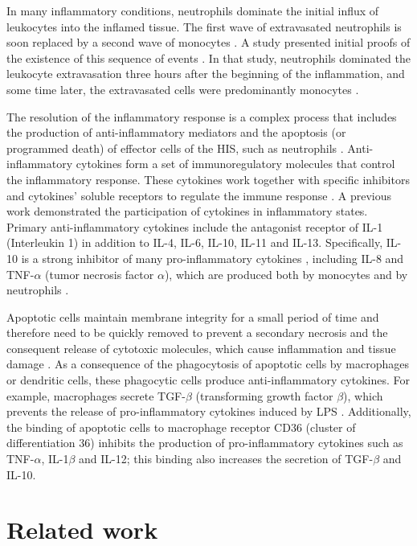 \documentclass[10pt]{bmc_article}
\newenvironment{bmcformat}{\baselineskip20pt\sloppy\setboolean{publ}{false}}{\baselineskip20pt\sloppy}
\begin{document}
\begin{bmcformat}
In many inflammatory conditions, neutrophils dominate the initial influx of leukocytes into the inflamed tissue. The first wave of 
extravasated neutrophils is soon replaced by a second wave of monocytes \cite{Sompayrac2008}. A study presented initial proofs of the existence of this 
sequence of events \cite{Rebuck1955}. In that study, neutrophils dominated the leukocyte extravasation three hours after the beginning 
of the inflammation, and some time later, the extravasated cells were predominantly monocytes \cite{Rebuck1955}. 

The resolution of the inflammatory response is a complex process that includes the production of anti-inflammatory mediators and the 
apoptosis (or programmed death) of effector cells of the HIS, such as neutrophils \cite{Opal2000}. Anti-inflammatory cytokines form a set of 
immunoregulatory molecules that control the inflammatory response. These cytokines work together with specific inhibitors and cytokines' 
soluble receptors to regulate the immune response \cite{Opal2000}. A previous work \cite{Opal2000} demonstrated the participation of cytokines in 
inflammatory states. Primary anti-inflammatory cytokines include the antagonist receptor of IL-1 (Interleukin 1) in addition to IL-4, 
IL-6, IL-10, IL-11 and IL-13\cite{Opal2000}. Specifically, IL-10 is a strong inhibitor of many pro-inflammatory cytokines \cite{Fiorentino1991}, 
including IL-8 and TNF-$\alpha$ (tumor necrosis factor $\alpha$), which are produced both by monocytes \cite{Waal1991} and by 
neutrophils \cite{Cassatella1993,Marie1996}.

Apoptotic cells maintain membrane integrity for a small period of time and therefore need to be quickly removed to prevent a secondary 
necrosis and the consequent release of cytotoxic molecules, which cause inflammation and tissue damage \cite{Kennedy2009}. As a 
consequence of the phagocytosis of apoptotic cells by macrophages or dendritic cells, these phagocytic cells produce anti-inflammatory 
cytokines. For example, macrophages secrete TGF-$\beta$ (transforming growth factor $\beta$), which prevents the release of 
pro-inflammatory cytokines induced by LPS \cite{Lucas2006}. Additionally, the binding of apoptotic cells to macrophage receptor 
CD36 (cluster of differentiation 36) inhibits the production of pro-inflammatory cytokines such as TNF-$\alpha$, IL-1$\beta$ and IL-12; 
this binding also increases the secretion of TGF-$\beta$ and IL-10\cite{Voll1997}. 

\section*{Related work}\label{RelatedWorks}


\end{bmcformat}
\end{document}
